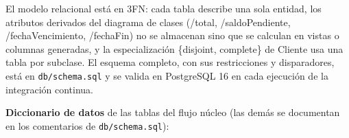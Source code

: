 El modelo relacional está en 3FN: cada tabla describe una sola entidad, los atributos derivados del
diagrama de clases (/total, /saldoPendiente, /fechaVencimiento, /fechaFin) no se almacenan sino que se
calculan en vistas o columnas generadas, y la especialización \{disjoint, complete\} de Cliente usa una
tabla por subclase. El esquema completo, con sus restricciones y disparadores, está en
\texttt{db/schema.sql} y se valida en PostgreSQL 16 en cada ejecución de la integración continua.


\textbf{Diccionario de datos} de las tablas del flujo núcleo (las demás se documentan en los
comentarios de \texttt{db/schema.sql}):

